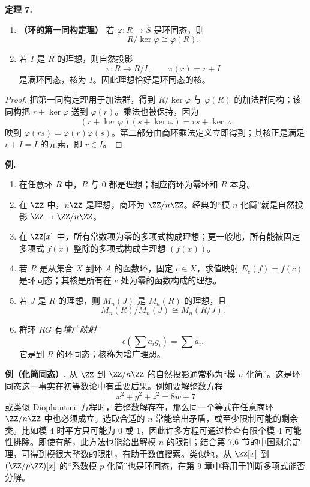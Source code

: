 \medskip
\noindent\textbf{定理 7.}
\begin{enumerate}[label=(\arabic*)]
  \item \textbf{（环的第一同构定理）} 若 $\varphi:R\to S$ 是环同态，则
  \[
    R/\ker\varphi\cong\varphi(R).
  \]
  \item 若 $I$ 是 $R$ 的理想，则自然投影
  \[
    \pi:R\to R/I,
    \qquad \pi(r)=r+I
  \]
  是满环同态，核为 $I$。因此理想恰好是环同态的核。
\end{enumerate}

\begin{proof}
把第一同构定理用于加法群，得到 $R/\ker\varphi$ 与 $\varphi(R)$ 的加法群同构；该同构把 $r+\ker\varphi$ 送到 $\varphi(r)$。乘法也被保持，因为
\[
  (r+
  \ker\varphi)(s+\ker\varphi)=rs+
  \ker\varphi
\]
映到 $\varphi(rs)=\varphi(r)\varphi(s)$。第二部分由商环乘法定义立即得到；其核正是满足 $r+I=I$ 的元素，即 $r\in I$。
\end{proof}

\medskip
\noindent\textbf{例.}
\begin{enumerate}[label=(\arabic*)]
  \item 在任意环 $R$ 中，$R$ 与 $0$ 都是理想；相应商环为零环和 $R$ 本身。
  \item 在 $\ZZ$ 中，$n\ZZ$ 是理想，商环为 $\ZZ/n\ZZ$。经典的“模 $n$ 化简”就是自然投影 $\ZZ\to\ZZ/n\ZZ$。
  \item 在 $\ZZ[x]$ 中，所有常数项为零的多项式构成理想；更一般地，所有能被固定多项式 $f(x)$ 整除的多项式构成主理想 $(f(x))$。
  \item 若 $R$ 是从集合 $X$ 到环 $A$ 的函数环，固定 $c\in X$，求值映射 $E_c(f)=f(c)$ 是环同态；其核是所有在 $c$ 处为零的函数构成的理想。
  \item 若 $J$ 是 $R$ 的理想，则 $M_n(J)$ 是 $M_n(R)$ 的理想，且
  \[
    M_n(R)/M_n(J)\cong M_n(R/J).
  \]
  \item 群环 $RG$ 有\emph{增广映射}
  \[
    \epsilon\left(\sum a_i g_i\right)=\sum a_i.
  \]
  它是到 $R$ 的环同态；核称为增广理想。
\end{enumerate}

\medskip
\noindent\textbf{例（化简同态）.}
从 $\ZZ$ 到 $\ZZ/n\ZZ$ 的自然投影通常称为“模 $n$ 化简”。这是环同态这一事实在初等数论中有重要后果。例如要解整数方程
\[
  x^2+y^2+z^2=8w+7
\]
或类似 Diophantine 方程时，若整数解存在，那么同一个等式在任意商环 $\ZZ/n\ZZ$ 中也必须成立。选取合适的 $n$ 常能给出矛盾，或至少限制可能的剩余类。比如模 $4$ 时平方只可能为 $0$ 或 $1$，因此许多方程可通过检查有限个模 $4$ 可能性排除。即使有解，此方法也能给出解模 $n$ 的限制；结合第 7.6 节的中国剩余定理，可得到模很大整数的限制，有助于数值搜索。类似地，从 $\ZZ[x]$ 到 $(\ZZ/p\ZZ)[x]$ 的“系数模 $p$ 化简”也是环同态，在第 9 章中将用于判断多项式能否分解。

